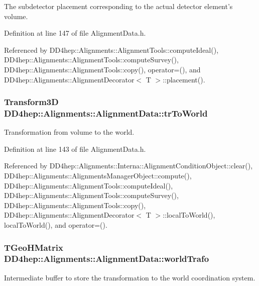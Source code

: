 The subdetector placement corresponding to the actual detector element's volume. 

Definition at line 147 of file AlignmentData.h.

Referenced by DD4hep::Alignments::AlignmentTools::computeIdeal(), DD4hep::Alignments::AlignmentTools::computeSurvey(), DD4hep::Alignments::AlignmentTools::copy(), operator=(), and DD4hep::Alignments::AlignmentDecorator$<$ T $>$::placement().\hypertarget{class_d_d4hep_1_1_alignments_1_1_alignment_data_a468b2dee055c6e6894ae65d37a53712e}{
\subsubsection[{trToWorld}]{\setlength{\rightskip}{0pt plus 5cm}Transform3D {\bf DD4hep::Alignments::AlignmentData::trToWorld}}}
\label{class_d_d4hep_1_1_alignments_1_1_alignment_data_a468b2dee055c6e6894ae65d37a53712e}


Transformation from volume to the world. 

Definition at line 143 of file AlignmentData.h.

Referenced by DD4hep::Alignments::Interna::AlignmentConditionObject::clear(), DD4hep::Alignments::AlignmentsManagerObject::compute(), DD4hep::Alignments::AlignmentTools::computeIdeal(), DD4hep::Alignments::AlignmentTools::computeSurvey(), DD4hep::Alignments::AlignmentTools::copy(), DD4hep::Alignments::AlignmentDecorator$<$ T $>$::localToWorld(), localToWorld(), and operator=().\hypertarget{class_d_d4hep_1_1_alignments_1_1_alignment_data_a87234aee58d8e087377b029de83ebcd8}{
\subsubsection[{worldTrafo}]{\setlength{\rightskip}{0pt plus 5cm}TGeoHMatrix {\bf DD4hep::Alignments::AlignmentData::worldTrafo}}}
\label{class_d_d4hep_1_1_alignments_1_1_alignment_data_a87234aee58d8e087377b029de83ebcd8}


Intermediate buffer to store the transformation to the world coordination system. 

